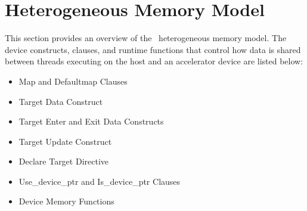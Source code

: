 
\section{Heterogeneous Memory Model}
\label{ssec:06.heterogeneous-memory-model}

This section provides an overview of the \OMP\ heterogeneous memory model.
The device constructs, clauses, and runtime functions that control how data is shared
between threads executing on the host and an accelerator device are listed below:

\begin{itemize}
  \item Map and Defaultmap Clauses
  \item Target Data Construct
  \item Target Enter and Exit Data Constructs
  \item Target Update Construct
  \item Declare Target Directive
  \item Use\_device\_ptr and Is\_device\_ptr Clauses
  \item Device Memory Functions
\end{itemize}


